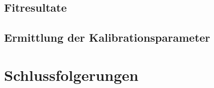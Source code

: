 

\subsection{Fitresultate}


\subsection{Ermittlung der Kalibrationsparameter}


\section{Schlussfolgerungen}

